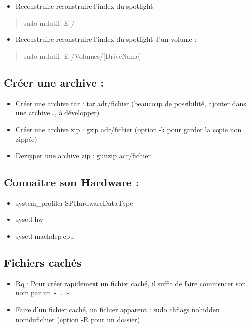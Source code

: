 \begin{itemize}
\tightlist
\item
  Reconstruire reconstruire l'index du spotlight :
\end{itemize}

\begin{quote}
sudo mdutil -E /
\end{quote}

\begin{itemize}
\tightlist
\item
  Reconstruire reconstruire l'index du spotlight d'un volume :
\end{itemize}

\begin{quote}
sudo mdutil -E /Volumes/{[}DriveName{]}
\end{quote}

\subsection{Créer une archive :}\label{cruxe9er-une-archive}

\begin{itemize}
\tightlist
\item
  Créer une archive tar : tar adr/fichier (beaucoup de possibilité,
  ajouter dans une archive\ldots{}, à développer)
\item
  Créer une archive zip : gzip adr/fichier (option -k pour garder la
  copie non zippée)
\item
  Dezipper une archive zip : gunzip adr/fichier
\end{itemize}

\subsection{Connaître son Hardware :}\label{connauxeetre-son-hardware}

\begin{itemize}
\tightlist
\item
  system\_profiler SPHardwareDataType
\item
  sysctl hw
\item
  sysctl machdep.cpu
\end{itemize}

\subsection{Fichiers cachés}\label{fichiers-cachuxe9s}

\begin{itemize}
\item
  Rq : Pour créer rapidement un fichier caché, il suffit de faire
  commencer son nom par un «~.~».
\item
  Faire d'un fichier caché, un fichier apparent : sudo chflags nohidden
  nomdufichier (option -R pour un dossier)
\end{itemize}

